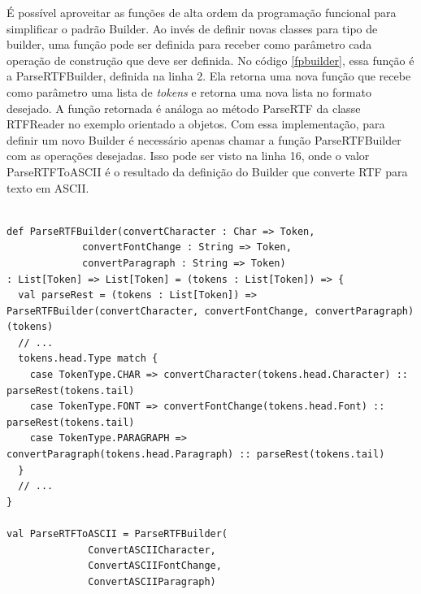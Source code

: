 É possível aproveitar as funções de alta ordem 
da programação funcional para simplificar o 
padrão Builder. Ao invés de definir novas 
classes para tipo de builder, uma função pode 
ser definida para receber como parâmetro cada 
operação de construção que deve ser definida. 
No código \ref{fpbuilder}, essa função é a 
ParseRTFBuilder, definida na linha 2. Ela 
retorna uma nova função que recebe como 
parâmetro uma lista de \textit{tokens} e 
retorna uma nova lista no formato desejado. 
A função retornada é análoga ao método 
ParseRTF da classe RTFReader no exemplo 
orientado a objetos. Com essa implementação, 
para definir um novo Builder é necessário apenas 
chamar a função ParseRTFBuilder com as operações 
desejadas. Isso pode ser visto na linha 16, 
onde o valor ParseRTFToASCII é o resultado 
da definição do Builder que converte RTF para 
texto em ASCII.

\begin{lstlisting}[caption={Builder Funcional},label=fpbuilder]
    
def ParseRTFBuilder(convertCharacter : Char => Token,
             convertFontChange : String => Token,
             convertParagraph : String => Token)
: List[Token] => List[Token] = (tokens : List[Token]) => {
  val parseRest = (tokens : List[Token]) => ParseRTFBuilder(convertCharacter, convertFontChange, convertParagraph)(tokens)
  // ...
  tokens.head.Type match {
    case TokenType.CHAR => convertCharacter(tokens.head.Character) :: parseRest(tokens.tail)
    case TokenType.FONT => convertFontChange(tokens.head.Font) :: parseRest(tokens.tail)
    case TokenType.PARAGRAPH => convertParagraph(tokens.head.Paragraph) :: parseRest(tokens.tail)
  }
  // ...
}

val ParseRTFToASCII = ParseRTFBuilder(
              ConvertASCIICharacter,
              ConvertASCIIFontChange,
              ConvertASCIIParagraph)
    
\end{lstlisting}